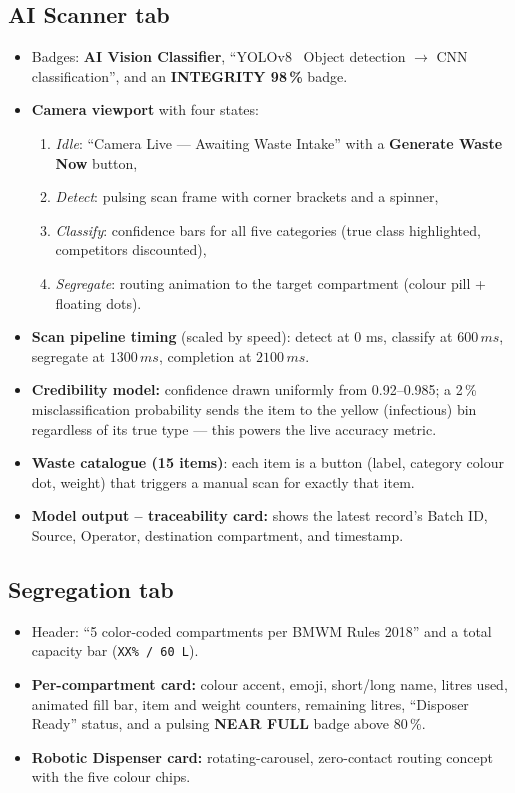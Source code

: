 \documentclass[11pt, a4paper]{article}
\begin{document}
\subsection{AI Scanner tab}
\begin{itemize}[leftmargin=1.6em, itemsep=2pt]
  \item Badges: \textbf{AI Vision Classifier}, ``YOLOv8 \textperiodcentered\
        Object detection $\rightarrow$ CNN classification'', and an
        \textbf{INTEGRITY 98\,\%} badge.
  \item \textbf{Camera viewport} with four states:
    \begin{enumerate}[leftmargin=1.6em, itemsep=2pt]
      \item \emph{Idle}: ``Camera Live --- Awaiting Waste Intake'' with a
            \textbf{Generate Waste Now} button,
      \item \emph{Detect}: pulsing scan frame with corner brackets and a
            spinner,
      \item \emph{Classify}: confidence bars for all five categories
            (true class highlighted, competitors discounted),
      \item \emph{Segregate}: routing animation to the target compartment
            (colour pill + floating dots).
    \end{enumerate}
  \item \textbf{Scan pipeline timing} (scaled by speed): detect at 0 ms,
        classify at $600\,ms$, segregate at $1300\,ms$, completion at
        $2100\,ms$.
  \item \textbf{Credibility model:} confidence drawn uniformly from
        0.92--0.985; a 2\,\% misclassification probability sends the item to
        the yellow (infectious) bin regardless of its true type --- this powers
        the live accuracy metric.
  \item \textbf{Waste catalogue (15 items)}: each item is a button (label,
        category colour dot, weight) that triggers a manual scan for exactly
        that item.
  \item \textbf{Model output -- traceability card:} shows the latest record's
        Batch ID, Source, Operator, destination compartment, and timestamp.
\end{itemize}

\subsection{Segregation tab}
\begin{itemize}[leftmargin=1.6em, itemsep=2pt]
  \item Header: ``5 color-coded compartments per BMWM Rules 2018'' and a total
        capacity bar (\texttt{XX\% / 60\,L}).
  \item \textbf{Per-compartment card:} colour accent, emoji, short/long name,
        litres used, animated fill bar, item and weight counters, remaining
        litres, ``Disposer Ready'' status, and a pulsing
        \textbf{NEAR FULL} badge above 80\,\%.
  \item \textbf{Robotic Dispenser card:} rotating-carousel, zero-contact
        routing concept with the five colour chips.
\end{itemize}
\end{document}
